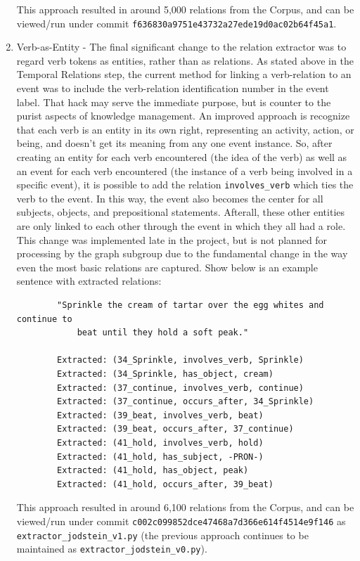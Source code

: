 \documentclass[11pt,letterpaper]{article}
\begin{document}
\begin{enumerate}
    This approach resulted in around 5,000 relations from the Corpus, and can be viewed/run under commit \texttt{f636830a9751e43732a27ede19d0ac02b64f45a1}.
    
    \item Verb-as-Entity - The final significant change to the relation extractor was to regard verb tokens as entities, rather than as relations.  As stated above in the Temporal Relations step, the current method for linking a verb-relation to an event was to include the verb-relation identification number in the event label.  That hack may serve the immediate purpose, but is counter to the purist aspects of knowledge management.  An improved approach is recognize that each verb is an entity in its own right, representing an activity, action, or being, and doesn't get its meaning from any one event instance.  So, after creating an entity for each verb encountered (the idea of the verb) as well as an event for each verb encountered (the instance of a verb being involved in a specific event), it is possible to add the relation \texttt{involves\_verb} which ties the verb to the event.  In this way, the event also becomes the center for all subjects, objects, and prepositional statements.  Afterall, these other entities are only linked to each other through the event in which they all had a role.  This change was implemented late in the project, but is not planned for processing by the graph subgroup due to the fundamental change in the way even the most basic relations are captured.  Show below is an example sentence with extracted relations:
    
    \begin{verbatim}
        "Sprinkle the cream of tartar over the egg whites and continue to 
            beat until they hold a soft peak."
            
        Extracted: (34_Sprinkle, involves_verb, Sprinkle) 
        Extracted: (34_Sprinkle, has_object, cream)
        Extracted: (37_continue, involves_verb, continue)
        Extracted: (37_continue, occurs_after, 34_Sprinkle)
        Extracted: (39_beat, involves_verb, beat)
        Extracted: (39_beat, occurs_after, 37_continue)
        Extracted: (41_hold, involves_verb, hold)
        Extracted: (41_hold, has_subject, -PRON-)
        Extracted: (41_hold, has_object, peak)
        Extracted: (41_hold, occurs_after, 39_beat)
    \end{verbatim}
    
    
    This approach resulted in around 6,100 relations from the Corpus, and can be viewed/run under commit \texttt{c002c099852dce47468a7d366e614f4514e9f146} as \texttt{extractor\_jodstein\_v1.py} (the previous approach continues to be maintained as \texttt{extractor\_jodstein\_v0.py}).

\end{enumerate}
\end{document}
